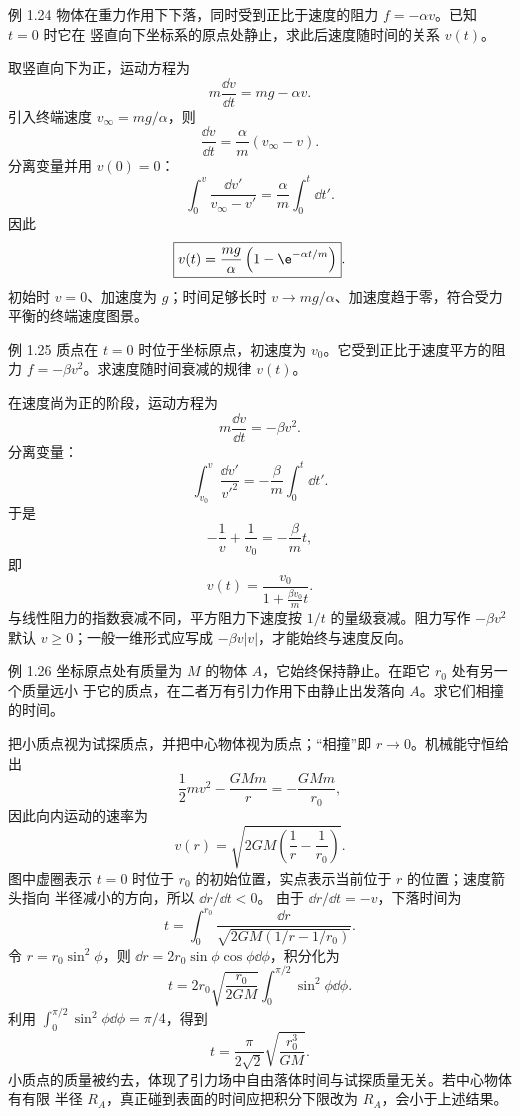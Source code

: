 \begin{origexamplebox}{例 1.24}
物体在重力作用下下落，同时受到正比于速度的阻力 $f=-\alpha v$。已知 $t=0$ 时它在
竖直向下坐标系的原点处静止，求此后速度随时间的关系 $v(t)$。
\end{origexamplebox}

\begin{xesolution}
取竖直向下为正，运动方程为
\[
 m\frac{\dd v}{\dd t}=mg-\alpha v.
\]
引入终端速度 $v_\infty=mg/\alpha$，则
\[
 \frac{\dd v}{\dd t}=\frac\alpha m(v_\infty-v).
\]
分离变量并用 $v(0)=0$：
\[
 \int_0^v\frac{\dd v'}{v_\infty-v'}
 =\frac\alpha m\int_0^t\dd t'.
\]
因此
\[
 \boxed{v(t)=\frac{mg}{\alpha}
 \left(1-\e^{-\alpha t/m}\right)}.
\]
初始时 $v=0$、加速度为 $g$；时间足够长时 $v\to mg/\alpha$、加速度趋于零，符合受力
平衡的终端速度图景。
\end{xesolution}

\begin{origexamplebox}{例 1.25}
质点在 $t=0$ 时位于坐标原点，初速度为 $v_0$。它受到正比于速度平方的阻力
$f=-\beta v^2$。求速度随时间衰减的规律 $v(t)$。
\end{origexamplebox}

\begin{xesolution}
在速度尚为正的阶段，运动方程为
\[
 m\frac{\dd v}{\dd t}=-\beta v^2.
\]
分离变量：
\[
 \int_{v_0}^{v}\frac{\dd v'}{v'^2}
 =-\frac\beta m\int_0^t\dd t'.
\]
于是
\[
 -\frac1v+\frac1{v_0}=-\frac\beta m t,
\]
即
\[
 \boxed{v(t)=\frac{v_0}{1+\frac{\beta v_0}{m}t}}.
\]
与线性阻力的指数衰减不同，平方阻力下速度按 $1/t$ 的量级衰减。阻力写作
$-\beta v^2$ 默认 $v\ge0$；一般一维形式应写成 $-\beta v|v|$，才能始终与速度反向。
\end{xesolution}

\Needspace{0.30\textheight}
\begin{origexamplebox}{例 1.26}
坐标原点处有质量为 $M$ 的物体 $A$，它始终保持静止。在距它 $r_0$ 处有另一个质量远小
于它的质点，在二者万有引力作用下由静止出发落向 $A$。求它们相撞的时间。
\end{origexamplebox}

\begin{xesolution}
把小质点视为试探质点，并把中心物体视为质点；“相撞”即 $r\to0$。机械能守恒给出
\[
 \frac12mv^2-\frac{GMm}{r}=-\frac{GMm}{r_0},
\]
因此向内运动的速率为
\[
 v(r)=\sqrt{2GM\left(\frac1r-\frac1{r_0}\right)}.
\]
\radialFallDiagram
图中虚圈表示 $t=0$ 时位于 $r_0$ 的初始位置，实点表示当前位于 $r$ 的位置；速度箭头指向
半径减小的方向，所以 $\dd r/\dd t<0$。
由于 $\dd r/\dd t=-v$，下落时间为
\[
 t=\int_0^{r_0}\frac{\dd r}
 {\sqrt{2GM(1/r-1/r_0)}}.
\]
令 $r=r_0\sin^2\phi$，则 $\dd r=2r_0\sin\phi\cos\phi\dd\phi$，积分化为
\[
 t=2r_0\sqrt{\frac{r_0}{2GM}}
 \int_0^{\pi/2}\sin^2\phi\dd\phi.
\]
利用 $\int_0^{\pi/2}\sin^2\phi\dd\phi=\pi/4$，得到
\[
 \boxed{t=\frac{\pi}{2\sqrt2}
 \sqrt{\frac{r_0^3}{GM}}}.
\]
小质点的质量被约去，体现了引力场中自由落体时间与试探质量无关。若中心物体有有限
半径 $R_A$，真正碰到表面的时间应把积分下限改为 $R_A$，会小于上述结果。
\end{xesolution}

